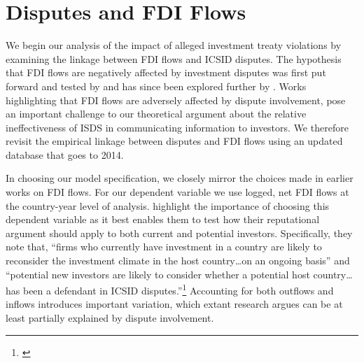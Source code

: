 \documentclass[12pt,onesided]{amsart}
\begin{document}

\section*{Disputes and FDI Flows}

We begin our analysis of the impact of alleged investment treaty violations by examining the linkage between FDI flows and ICSID disputes. The hypothesis that FDI flows are negatively affected by investment disputes was first put forward and tested by \citet{allee:peinhardt:2011} and has since been explored further by \citet{aisbettbilateral}. Works highlighting that FDI flows are adversely affected by dispute involvement, pose an important challenge to our theoretical argument about the relative ineffectiveness of ISDS in communicating information to investors. We therefore revisit the empirical linkage between disputes and FDI flows using an updated database that goes to 2014.


In choosing our model specification, we closely mirror the choices made in earlier works on FDI flows. For our dependent variable we use logged, net FDI flows at the country-year level of analysis. \citeauthor{allee:peinhardt:2011} highlight the importance of choosing this dependent variable as it best enables them to test how their reputational argument should apply to both current and potential investors. Specifically, they note that, ``firms who currently have investment in a country are likely to reconsider the investment climate in the host country\ldots on an ongoing basis'' and ``potential new investors are likely to consider whether a potential host country\ldots has been a defendant in ICSID disputes.''\footnote{\citet[p. 419--420]{allee:peinhardt:2011}} Accounting for both outflows and inflows introduces important variation, which extant research argues can be at least partially explained by dispute involvement. 
\end{document}

